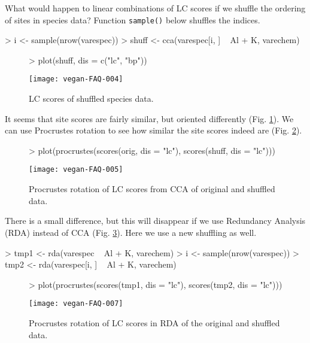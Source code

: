 \documentclass[a4paper]{article}
\begin{document}
What would happen to linear combinations of LC scores if we shuffle
the ordering of sites in species data?  Function \texttt{sample()} below
shuffles the indices.
\begin{Schunk}
\begin{Sinput}
> i <- sample(nrow(varespec))
> shuff <- cca(varespec[i, ] ~ Al + K, varechem)
\end{Sinput}
\end{Schunk}
\begin{figure}
\begin{center}
\begin{Schunk}
\begin{Sinput}
> plot(shuff, dis = c("lc", "bp"))
\end{Sinput}
\end{Schunk}
\texttt{[image: vegan-FAQ-004]}
\caption{LC scores of shuffled species data.}
\label{fig:ccashuff}
\end{center}
\end{figure}
It seems that site scores are fairly similar, but oriented differently
(Fig. \ref{fig:ccashuff}).  We can use Procrustes rotation to see how
similar the site scores indeed are (Fig. \ref{fig:ccaproc}).
\begin{figure}
\begin{center}
\begin{Schunk}
\begin{Sinput}
> plot(procrustes(scores(orig, dis = "lc"), scores(shuff, dis = "lc")))
\end{Sinput}
\end{Schunk}
\texttt{[image: vegan-FAQ-005]}
\caption{Procrustes rotation of LC scores from CCA of original and shuffled data.}
\label{fig:ccaproc}
\end{center}
\end{figure}
There is a small difference, but this will disappear if we use
Redundancy Analysis (RDA) instead of CCA
(Fig. \ref{fig:rdaproc}). Here we use a new shuffling as well.
\begin{Schunk}
\begin{Sinput}
> tmp1 <- rda(varespec ~ Al + K, varechem)
> i <- sample(nrow(varespec))
> tmp2 <- rda(varespec[i, ] ~ Al + K, varechem)
\end{Sinput}
\end{Schunk}
\begin{figure}
\begin{center}
\begin{Schunk}
\begin{Sinput}
> plot(procrustes(scores(tmp1, dis = "lc"), scores(tmp2, dis = "lc")))
\end{Sinput}
\end{Schunk}
\texttt{[image: vegan-FAQ-007]}
\caption{Procrustes rotation of LC scores in RDA of the original and shuffled data.}
\label{fig:rdaproc}
\end{center}
\end{figure}
\end{document}
